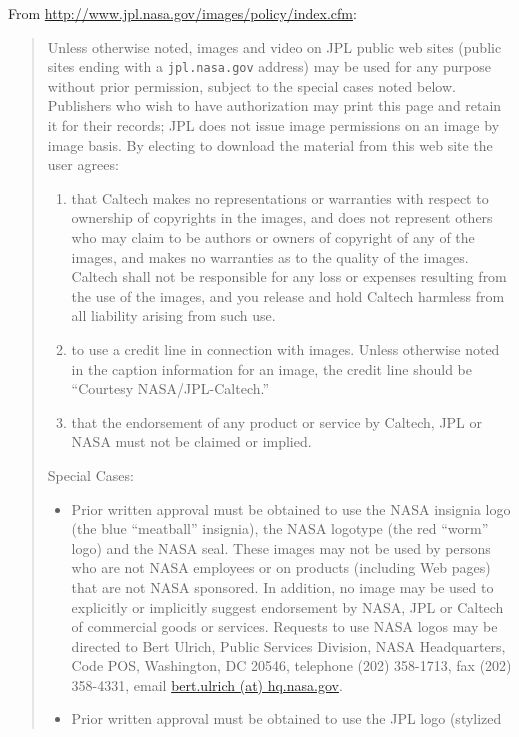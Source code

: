 From \url{http://www.jpl.nasa.gov/images/policy/index.cfm}:
\begin{quotation}
    \noindent Unless otherwise noted, images and video on JPL public web sites (public
    sites ending with a \texttt{jpl.nasa.gov} address) may be used for any purpose
    without prior permission, subject to the special cases noted below.
    Publishers who wish to have authorization may print this page and retain
    it for their records; JPL does not issue image permissions on an image
    by image basis.  By electing to download the material from this web site
    the user agrees:
	\begin{enumerate}
    \item that Caltech makes no representations or warranties with respect to
       ownership of copyrights in the images, and does not represent others
       who may claim to be authors or owners of copyright of any of the
       images, and makes no warranties as to the quality of the images.
       Caltech shall not be responsible for any loss or expenses resulting
       from the use of the images, and you release and hold Caltech harmless
       from all liability arising from such use.
    \item to use a credit line in connection with images. Unless otherwise
       noted in the caption information for an image, the credit line should
       be ``Courtesy NASA/JPL-Caltech.''
    \item that the endorsement of any product or service by Caltech, JPL or
       NASA must not be claimed or implied.
    \end{enumerate}
    Special Cases:
	\begin{itemize}
    \item Prior written approval must be obtained to use the NASA insignia logo
      (the blue ``meatball'' insignia), the NASA logotype (the red ``worm''
      logo) and the NASA seal. These images may not be used by persons who
      are not NASA employees or on products (including Web pages) that are
      not NASA sponsored. In addition, no image may be used to explicitly
      or implicitly suggest endorsement by NASA, JPL or Caltech of
      commercial goods or services. Requests to use NASA logos may be
      directed to Bert Ulrich, Public Services Division, NASA Headquarters,
      Code POS, Washington, DC 20546, telephone (202) 358-1713, fax (202)
      358-4331, email \url{bert.ulrich (at) hq.nasa.gov}.
    \item Prior written approval must be obtained to use the JPL logo (stylized

\end{itemize}
\end{quotation}

